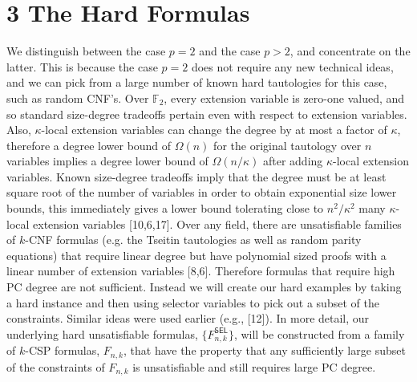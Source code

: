 \section*{3 The Hard Formulas}
We distinguish between the case $p=2$ and the case $p>2$, and concentrate on the latter. This is because the case $p=2$ does not require any new technical ideas, and we can pick from a large number of known hard tautologies for this case, such as random CNF's. Over $\mathbb F_2$, every extension variable is zero-one valued, and so standard size-degree tradeoffs pertain even with respect to extension variables. Also, $\kappa$-local extension variables can change the degree by at most a factor of $\kappa$, therefore a degree lower bound of $\Omega(n)$ for the original tautology over $n$ variables implies a degree lower bound of $\Omega(n/\kappa)$ after adding $\kappa$-local extension variables. Known size-degree tradeoffs imply that the degree must be at least square root of the number of variables in order to obtain exponential size lower bounds, this immediately gives a lower bound tolerating close to $n^2/\kappa^2$ many $\kappa$-local extension variables [10,6,17].
Over any field, there are unsatisfiable families of $k$-CNF formulas (e.g. the Tseitin tautologies as well as random parity equations) that require linear degree but have polynomial sized proofs with a linear number of extension variables [8,6]. Therefore formulas that require high PC degree are not sufficient. Instead we will create our hard examples by taking a hard instance and then using selector variables to pick out a subset of the constraints. Similar ideas were used earlier (e.g., [12]). In more detail, our underlying hard unsatisfiable formulas, $\{F^{\mathsf{SEL}}_{n,k}\}$, will be constructed from a family of $k$-CSP formulas, $F_{n,k}$, that have the property that any sufficiently large subset of the constraints of $F_{n,k}$ is unsatisfiable and still requires large PC degree.
